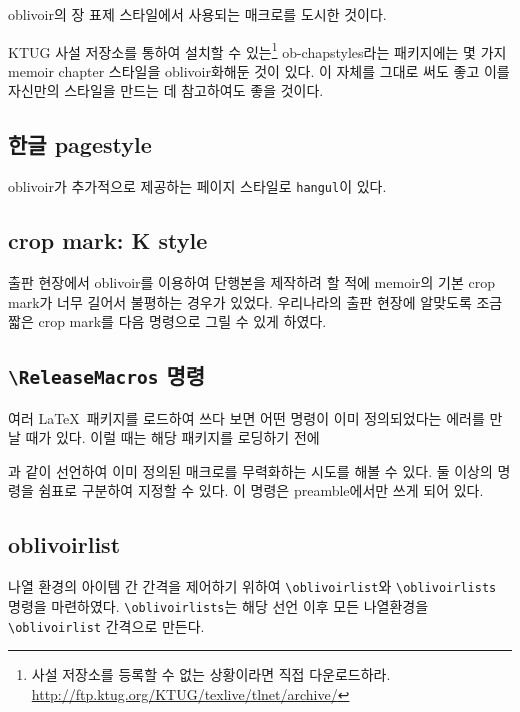 \documentclass[
	12pt,
	a4paper,
	kosection,
	footnote,
	nobookmarks,
	microtype,
	figtabcapt,
]{oblivoir}
\def\cs#1{\texttt{\textbackslash #1}}
\begin{document}
\는 \textsf{oblivoir}의 장 표제 스타일에서 사용되는
매크로를 도시한 것이다.

KTUG 사설 저장소를 통하여 설치할 수 있는\footnote{%
	사설 저장소를 등록할 수 없는 상황이라면 직접 다운로드하라. 
	\url{http://ftp.ktug.org/KTUG/texlive/tlnet/archive/}
}
ob-chapstyles라는 패키지에는 몇 가지 memoir
chapter 스타일을 oblivoir화해둔 것이 있다. 이 자체를 그대로 써도 좋고 이를 자신만의 스타일을
만드는 데 참고하여도 좋을 것이다.

\subsection{한글 pagestyle}

oblivoir가 추가적으로 제공하는 페이지 스타일로 \texttt{hangul}이 있다.
\begin{boxedverbatim}
\pagestyle{hangul}
\end{boxedverbatim}

\subsection{crop mark: K style}

출판 현장에서 oblivoir를 이용하여 단행본을 제작하려 할 적에 \textsf{memoir}의
기본 crop mark가 너무 길어서 불평하는 경우가 있었다. 우리나라의 출판 현장에
알맞도록 조금 짧은 crop mark를 다음 명령으로 그릴 수 있게 하였다.
\begin{boxedverbatim}
\trimKmark
\end{boxedverbatim}

\subsection{\cs{ReleaseMacros} 명령}

여러 \LaTeX\ 패키지를 로드하여 쓰다 보면 어떤 명령이 이미 정의되었다는 에러를
만날 때가 있다. 이럴 때는 해당 패키지를 로딩하기 전에
\begin{boxedverbatim}
\ReleaseMacros{\XeTeX,\XeLaTeX}
\end{boxedverbatim}
과 같이 선언하여 이미 정의된 매크로를 무력화하는 시도를 해볼 수 있다.
둘 이상의 명령을 쉼표로 구분하여 지정할 수 있다.
이 명령은 preamble에서만 쓰게 되어 있다.


\subsection{oblivoirlist}

나열 환경의 아이템 간 간격을 제어하기 위하여 \verb|\oblivoirlist|와 
\verb|\oblivoirlists| 명령을 마련하였다. \verb|\oblivoirlists|는
해당 선언 이후 모든 나열환경을 \verb|\oblivoirlist| 간격으로 만든다.
\end{document}
